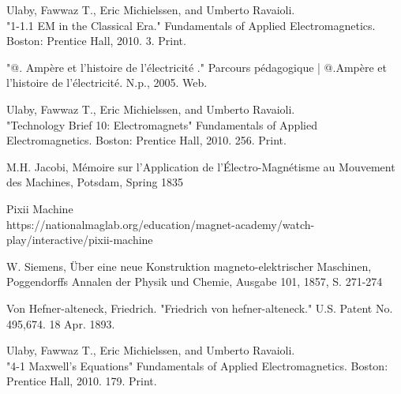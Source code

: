 \clearpage
\newpage
{}
    \begin{thebibliography}{9}

         Ulaby, Fawwaz T., Eric Michielssen, and Umberto Ravaioli.\\
        "1-1.1 EM in the Classical Era." Fundamentals of Applied Electromagnetics. Boston: Prentice Hall, 2010. 3. Print.

         "@. Ampère et l'histoire de l'électricité ." Parcours pédagogique | @.Ampère et l'histoire de l'électricité. N.p., 2005. Web.

         Ulaby, Fawwaz T., Eric Michielssen, and Umberto Ravaioli.\\
        "Technology Brief 10: Electromagnets" Fundamentals of Applied Electromagnetics. Boston: Prentice Hall, 2010. 256. Print.

         M.H. Jacobi, Mémoire sur l’Application de l’Électro-Magnétisme au Mouvement des Machines, Potsdam, Spring 1835

         Pixii Machine\\
        https://nationalmaglab.org/education/magnet-academy/watch-play/interactive/pixii-machine

         W. Siemens, Über eine neue Konstruktion magneto-elektrischer Maschinen, Poggendorffs Annalen der Physik und Chemie, Ausgabe 101, 1857, S. 271-274

         Von Hefner-alteneck, Friedrich. "Friedrich von hefner-alteneck." U.S. Patent No. 495,674. 18 Apr. 1893.

         Ulaby, Fawwaz T., Eric Michielssen, and Umberto Ravaioli.\\
        "4-1 Maxwell's Equations" Fundamentals of Applied Electromagnetics. Boston: Prentice Hall, 2010. 179. Print.

    \end{thebibliography}
